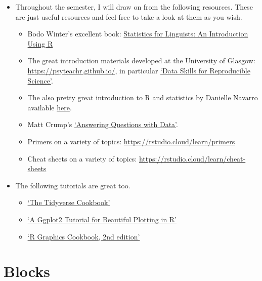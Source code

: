 \documentclass[
]{book}
\providecommand{\tightlist}{%
  \setlength{\itemsep}{0pt}\setlength{\parskip}{0pt}}
\begin{document}
\begin{itemize}
\tightlist
\item
  Throughout the semester, I will draw on from the following resources. These are just useful resources and feel free to take a look at them as you wish.

  \begin{itemize}
  \tightlist
  \item
    Bodo Winter's excellent book: \href{https://www.routledge.com/Statistics-for-Linguists-An-Introduction-Using-R/Winter/p/book/9781138056091}{Statistics for Linguists: An Introduction Using R}
  \item
    The great introduction materials developed at the University of Glasgow: \url{https://psyteachr.github.io/}, in particular \href{https://psyteachr.github.io/msc-data-skills/}{`Data Skills for Reproducible Science'}.
  \item
    The also pretty great introduction to R and statistics by Danielle Navarro available \href{https://learningstatisticswithr.com}{here}.
  \item
    Matt Crump's \href{https://crumplab.github.io/statistics/}{`Answering Questions with Data'}.
  \item
    Primers on a variety of topics: \url{https://rstudio.cloud/learn/primers}
  \item
    Cheat sheets on a variety of topics: \url{https://rstudio.cloud/learn/cheat-sheets}
  \end{itemize}
\item
  The following tutorials are great too.

  \begin{itemize}
  \tightlist
  \item
    \href{https://rstudio-education.github.io/tidyverse-cookbook/}{`The Tidyverse Cookbook'}
  \item
    \href{https://cedricscherer.netlify.app/2019/08/05/a-ggplot2-tutorial-for-beautiful-plotting-in-r/}{`A Ggplot2 Tutorial for Beautiful Plotting in R'}
  \item
    \href{https://r-graphics.org/}{`R Graphics Cookbook, 2nd edition'}
  \end{itemize}
\end{itemize}

\hypertarget{blocks}{%
\section{Blocks}\label{blocks}}
\end{document}
